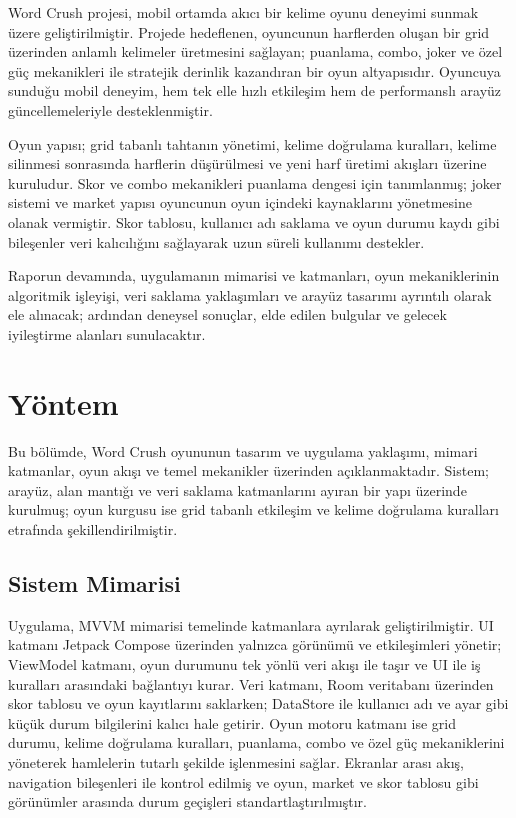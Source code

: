 \documentclass[conference]{IEEEtran}
\begin{document}
Word Crush projesi, mobil ortamda akıcı bir kelime oyunu deneyimi sunmak
üzere geliştirilmiştir. Projede hedeflenen, oyuncunun harflerden oluşan
bir grid üzerinden anlamlı kelimeler üretmesini sağlayan; puanlama, combo,
joker ve özel güç mekanikleri ile stratejik derinlik kazandıran bir oyun
altyapısıdır. Oyuncuya sunduğu mobil deneyim, hem tek elle hızlı
etkileşim hem de performanslı arayüz güncellemeleriyle desteklenmiştir.

Oyun yapısı; grid tabanlı tahtanın yönetimi, kelime doğrulama kuralları,
kelime silinmesi sonrasında harflerin düşürülmesi ve yeni harf üretimi
akışları üzerine kuruludur. Skor ve combo mekanikleri puanlama dengesi
için tanımlanmış; joker sistemi ve market yapısı oyuncunun oyun içindeki
kaynaklarını yönetmesine olanak vermiştir. Skor tablosu, kullanıcı adı
saklama ve oyun durumu kaydı gibi bileşenler veri kalıcılığını sağlayarak
uzun süreli kullanımı destekler.

Raporun devamında, uygulamanın mimarisi ve katmanları, oyun mekaniklerinin
algoritmik işleyişi, veri saklama yaklaşımları ve arayüz tasarımı
ayrıntılı olarak ele alınacak; ardından deneysel sonuçlar, elde edilen
bulgular ve gelecek iyileştirme alanları sunulacaktır.

\section{Yöntem}

Bu bölümde, Word Crush oyununun tasarım ve uygulama yaklaşımı, mimari
katmanlar, oyun akışı ve temel mekanikler üzerinden açıklanmaktadır.
Sistem; arayüz, alan mantığı ve veri saklama katmanlarını ayıran bir
yapı üzerinde kurulmuş; oyun kurgusu ise grid tabanlı etkileşim ve
kelime doğrulama kuralları etrafında şekillendirilmiştir.

\subsection{Sistem Mimarisi}

Uygulama, MVVM mimarisi temelinde katmanlara ayrılarak
geliştirilmiştir. UI katmanı Jetpack Compose üzerinden yalnızca
görünümü ve etkileşimleri yönetir; ViewModel katmanı, oyun
durumunu tek yönlü veri akışı ile taşır ve UI ile iş kuralları
arasındaki bağlantıyı kurar. Veri katmanı, Room veritabanı
üzerinden skor tablosu ve oyun kayıtlarını saklarken; DataStore
ile kullanıcı adı ve ayar gibi küçük durum bilgilerini kalıcı
hale getirir. Oyun motoru katmanı ise grid durumu, kelime
doğrulama kuralları, puanlama, combo ve özel güç mekaniklerini
yöneterek hamlelerin tutarlı şekilde işlenmesini sağlar.
Ekranlar arası akış, navigation bileşenleri ile kontrol edilmiş
ve oyun, market ve skor tablosu gibi görünümler arasında
durum geçişleri standartlaştırılmıştır.
\end{document}
